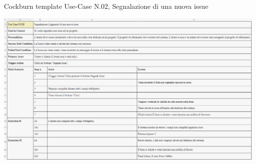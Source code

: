 \clearpage  %

	\begin{table}
		\centering
		\caption{Cockburn template Use-Case N.02, Segnalazione di una nuova issue}
		\includegraphics[width=1\linewidth]{./Assets/Chapters/cockburn.png}
	\end{table}

